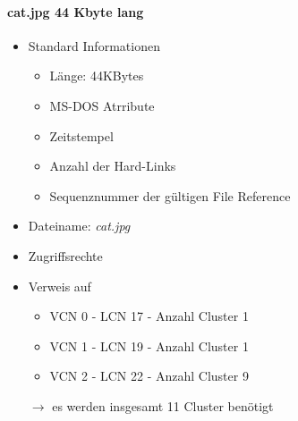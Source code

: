 \documentclass[a4paper]{article}
\begin{document}
\paragraph{cat.jpg 44 Kbyte lang}
\begin{itemize}
    \item Standard Informationen
        \begin{itemize}
            \item Länge: 44KBytes
            \item MS-DOS Atrribute
            \item Zeitstempel
            \item Anzahl der Hard-Links
            \item Sequenznummer der gültigen File Reference
        \end{itemize}
    \item Dateiname: \textit{cat.jpg}
    \item Zugriffsrechte
    \item Verweis auf \\
        \begin{itemize}
            \item VCN 0 - LCN 17 - Anzahl Cluster 1
            \item VCN 1 - LCN 19 - Anzahl Cluster 1
            \item VCN 2 - LCN 22 - Anzahl Cluster 9
        \end{itemize}
        $\rightarrow$ es werden insgesamt 11 Cluster benötigt
    \end{itemize}
\end{document}
